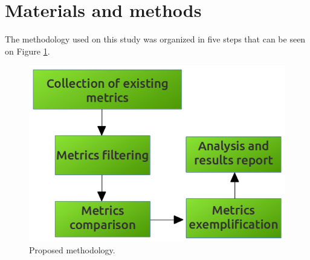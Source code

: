 \documentclass[conference]{IEEEtran}
\begin{document}
\section{Materials and methods}

The methodology used on this study was organized in five steps that can be seen on Figure \ref{metodologia}.

\begin{figure}[ht]
  \centering
  \includegraphics[width=.3\textwidth]{figuras/metodologia.png}
  \caption{Proposed methodology.}
  \label{metodologia}
\end{figure}
\end{document}
